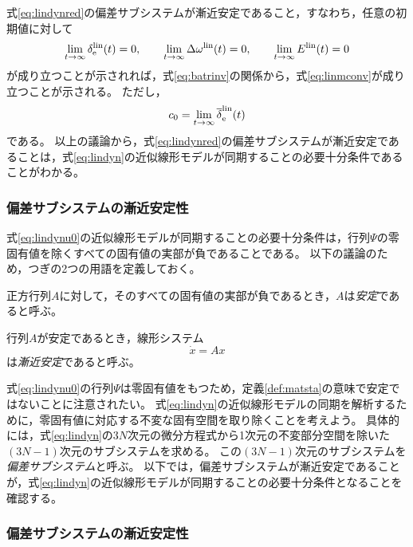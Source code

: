 \documentclass[tombow,dvipdfmx]{corona-a5}
\begin{document}
式\ref{eq:lindynred}の偏差サブシステムが漸近安定であること，すなわち，任意の初期値に対して
\[
\lim_{t\rightarrow \infty}\delta^{\rm lin}_{\rm e}(t)= 0 ,\qquad
\lim_{t\rightarrow \infty}\Delta \omega^{\rm lin}(t)=0 ,\qquad
\lim_{t\rightarrow \infty} E^{\rm lin}(t)=0
\]
が成り立つことが示されれば，式\ref{eq:batrinv}の関係から，式\ref{eq:linmconv}が成り立つことが示される。
ただし，
\[
c_0=
\lim_{t\rightarrow \infty} \overline{\delta}^{\rm lin}_{\rm e}(t) 
\]
である。
以上の議論から，式\ref{eq:lindynred}の偏差サブシステムが漸近安定であることは，式\ref{eq:lindyn}の近似線形モデルが同期することの必要十分条件であることがわかる。



\subsubsection{偏差サブシステムの漸近安定性}

式\ref{eq:lindynu0}の近似線形モデルが同期することの必要十分条件は，行列$\Psi$の零固有値を除くすべての固有値の実部が負であることである。
以下の議論のため，つぎの2つの用語を定義しておく。

\begin{定義}[正方行列の安定性]
\label{def:matsta}
正方行列$A$に対して，そのすべての固有値の実部が負であるとき，$A$は\emph{安定}であると呼ぶ。
\end{定義}

\begin{定義}[線形システムの漸近安定性]
\label{def:difsta}
行列$A$が安定であるとき，線形システム
\[
\dot{x}=Ax
\]
は\emph{漸近安定}であると呼ぶ。
\end{定義}

式\ref{eq:lindynu0}の行列$\Psi$は零固有値をもつため，定義\ref{def:matsta}の意味で安定ではないことに注意されたい。
式\ref{eq:lindyn}の近似線形モデルの同期を解析するために，零固有値に対応する不変な固有空間を取り除くことを考えよう。
具体的には，式\ref{eq:lindyn}の$3N$次元の微分方程式から1次元の不変部分空間を除いた$(3N-1)$次元のサブシステムを求める。
この$(3N-1)$次元のサブシステムを\emph{偏差サブシステム}と呼ぶ。
以下では，偏差サブシステムが漸近安定であることが，式\ref{eq:lindyn}の近似線形モデルが同期することの必要十分条件となることを確認する。



\subsubsection{偏差サブシステムの漸近安定性}
\end{document}
